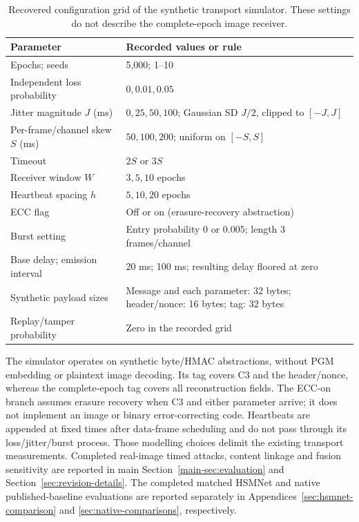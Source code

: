 \documentclass[journal]{IEEEtran}
\theoremstyle{definition}
\theoremstyle{game}
\begin{document}
\begin{table}[!t]
\centering
\caption{Recovered configuration grid of the synthetic transport
simulator. These settings do not describe the complete-epoch image receiver.}
\label{tab:repro-simulator}
\small
\setlength{\tabcolsep}{5pt}
\begin{tabular}{@{}ll@{}}
\toprule
Parameter & Recorded values or rule\\
\midrule
Epochs; seeds & 5,000; 1--10\\
Independent loss probability & $0,0.01,0.05$\\
Jitter magnitude $J$ (ms) & $0,25,50,100$; Gaussian SD $J/2$, clipped to $[-J,J]$\\
Per-frame/channel skew $S$ (ms) & $50,100,200$; uniform on $[-S,S]$\\
Timeout & $2S$ or $3S$\\
Receiver window $W$ & $3,5,10$ epochs\\
Heartbeat spacing $h$ & $5,10,20$ epochs\\
ECC flag & Off or on (erasure-recovery abstraction)\\
Burst setting & Entry probability $0$ or $0.005$; length 3 frames/channel\\
Base delay; emission interval & 20 ms; 100 ms; resulting delay floored at zero\\
Synthetic payload sizes & Message and each parameter: 32 bytes; header/nonce: 16 bytes; tag: 32 bytes\\
Replay/tamper probability & Zero in the recorded grid\\
\bottomrule
\end{tabular}
\end{table}

The simulator operates on synthetic byte/HMAC abstractions, without PGM
embedding or plaintext image decoding. Its tag covers C3 and the
header/nonce, whereas the complete-epoch tag covers all reconstruction fields. The ECC-on branch
assumes erasure recovery when C3 and either parameter arrive; it does not
implement an image or binary error-correcting code. Heartbeats are
appended at fixed times after data-frame scheduling and do not pass
through its loss/jitter/burst process. Those modelling choices delimit
the existing transport measurements. Completed real-image timed attacks, content linkage and fusion
sensitivity are reported in main Section~\ref{main-sec:evaluation} and
Section~\ref{sec:revision-details}. The completed matched HSMNet and
native published-baseline evaluations are reported separately in
Appendices~\ref{sec:hsmnet-comparison} and \ref{sec:native-comparisons},
respectively.
\end{document}
